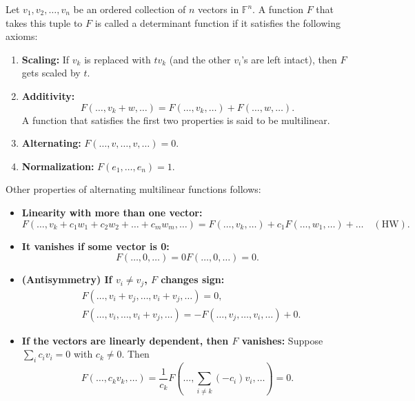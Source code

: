 \begin{outline}
    Let $v_1, v_2, \ldots, v_n$ be an ordered collection of $n$ vectors in $\mathbb{F}^n$. A function $F$ that takes this tuple to $F$ is called a determinant function if it satisfies the following axioms:

\begin{enumerate}
    \item \textbf{Scaling:} If $v_k$ is replaced with $t v_k$ (and the other $v_i$'s are left intact), then $F$ gets scaled by $t$.
    
    \item \textbf{Additivity:}
    \[
    F(\ldots, v_k + w, \ldots) = F(\ldots, v_k, \ldots) + F(\ldots, w, \ldots).
    \]
    A function that satisfies the first two properties is said to be multilinear.
    
    \item \textbf{Alternating:} $F(\ldots, v, \ldots, v, \ldots) = 0$.
    
    \item \textbf{Normalization:} $F(e_1, \ldots, e_n) = 1$.
\end{enumerate}

\end{outline}

Other properties of alternating multilinear functions follows: 

\begin{itemize}
    \item \textbf{Linearity with more than one vector:}
\[
F(\ldots, v_k + c_1w_1 + c_2w_2 + \ldots + c_mw_m, \ldots) = F(\ldots, v_k, \ldots) + c_1F(\ldots, w_1, \ldots) + \ldots \quad (\text{HW}).
\]

\item \textbf{It vanishes if some vector is 0:}
\[
F(\ldots, 0, \ldots) = 0F(\ldots, 0, \ldots) = 0.
\]

\item \textbf{(Antisymmetry) If $v_i \neq v_j$, $F$ changes sign:}
\[
\begin{aligned}
    &F(\ldots, v_i + v_j, \ldots, v_i + v_j, \ldots) = 0, \\
    &F(\ldots, v_i, \ldots, v_i + v_j, \ldots) = -F(\ldots, v_j, \ldots, v_i, \ldots) + 0.
\end{aligned}
\]

\item 
\textbf{If the vectors are linearly dependent, then $F$ vanishes:}
Suppose $\sum_i c_i v_i = 0$ with $c_k \neq 0$. Then
\[
F(\ldots, c_k v_k, \ldots) = \frac{1}{c_k} F(\ldots, \sum_{i \neq k} (-c_i) v_i, \ldots) = 0.
\]

\end{itemize}


